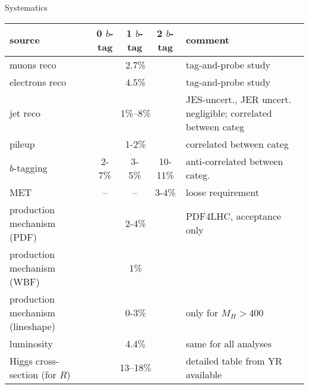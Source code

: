 \begin{frame}{Systematics}



\begin{center}
\tiny
\begin{tabular}{|l|c|c|c|p{5cm}|}
\hline
 source      &   0 $b$-tag   &   1 $b$-tag  &   2 $b$-tag  &   comment \\
\hline
\hline
muons  reco    &  \multicolumn{3}{|c|}{2.7\%}   &  tag-and-probe study \\
\hline
electrons reco &  \multicolumn{3}{|c|}{4.5\%}   &  tag-and-probe study  \\
\hline
jet reco             &  \multicolumn{3}{|c|}{1\%--8\%} &   JES-uncert., JER uncert. negligible; correlated between categ\\
\hline
pileup              &  \multicolumn{3}{|c|}{1-2\%}  & correlated between categ\\ %
\hline
$b$-tagging    &  2-7\%  & 3-5\% & 10-11\% & anti-correlated between categ.  \\
\hline
MET                 &  -- & -- & 3-4\% & loose requirement \\
\hline
production mechanism (PDF)&  \multicolumn{3}{|c|}{2-4\%}  & PDF4LHC, acceptance only\\
\hline
production mechanism (WBF)&   \multicolumn{3}{|c|}{1\%} & \\
\hline
production mechanism (lineshape)&   \multicolumn{3}{|c|}{0-3\%} & only for $M_H>400$  \\
\hline
luminosity            &  \multicolumn{3}{|c|}{4.4$\%$}   & same for all analyses \\
\hline
Higgs cross-section (for $R$) &  \multicolumn{3}{|c|}{13--18$\%$ } & detailed table from YR available   \\
\hline
\end{tabular}
\end{center}
\end{frame}



